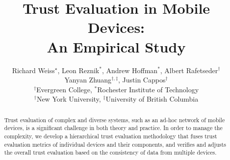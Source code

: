 \documentclass{IEEEtran}
\newcommand{\eat}[1]{}
\begin{document}
\title{Trust Evaluation in Mobile Devices: \\An Empirical Study}
\author{Richard Weiss$^{\star}$, Leon Reznik$^*$, Andrew Hoffman$^*$, Albert Rafetseder$^{\dag}$\\
Yanyan Zhuang$^{\dag, \ddag}$, Justin Cappos$^{\dag}$\\
$^{\dag}$Evergreen College, $^*$Rochester Institute of Technology\\
$^{\dag}$New York University, $^{\ddag}$University of British Columbia}

\maketitle


\begin{abstract}
Trust evaluation of complex and diverse systems, such as an ad-hoc network 
of mobile devices, is a significant challenge in both theory and practice. 
In order to manage the complexity, we develop a hierarchical trust 
evaluation methodology that fuses trust evaluation metrics of individual devices 
and their components, and verifies and adjusts the overall trust evaluation 
based on the consistency of data from multiple devices.
  

\eat{
  Smartphones and mobile devices install software from a 
wide range of sources.  As these devices become
more popular, the risks of associated malware will become more significant.
One of the features of these platforms is that they are rich in
sensors\footnote{In this work, smartphone sensors are broadly defined as hardware components that can record phenomena about the physical world.}.  These sensors can be a risk to privacy in that they could leak information about the 
user and user activities.  On the other side, they can also be used as an
advantage if they can be used to evaluate trust.
This paper builds  a hierarchical trust evaluation 
 framework 
that uses sensors to evaluate trust and detect anomalies.
} %


\end{abstract}
\end{document}
